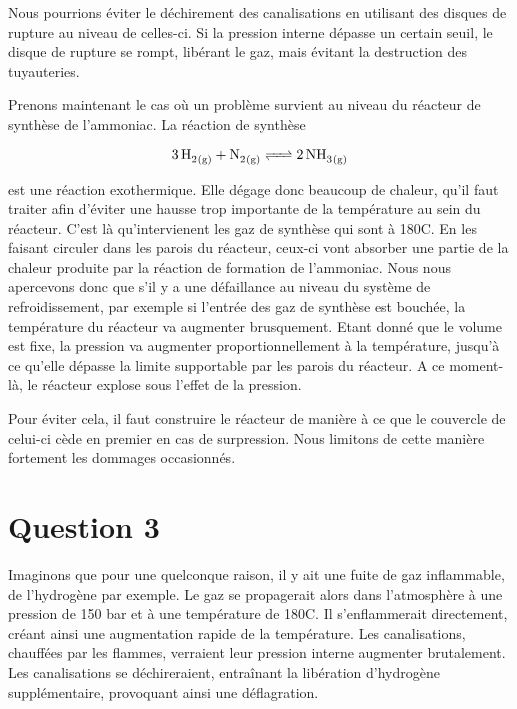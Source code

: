 \documentclass[a4paper,oneside,12pt]{article}
\begin{document}
Nous pourrions éviter le déchirement des canalisations en utilisant des disques de rupture au niveau de celles-ci. Si la pression interne dépasse un certain seuil, le disque de rupture se rompt, libérant le gaz, mais évitant la destruction des tuyauteries.
\newline

Prenons maintenant le cas où un problème survient au niveau du réacteur de synthèse de l'ammoniac. La réaction de synthèse

\begin{equation*}
	\ce{3 \, H2_{(g)} + N2_{(g)} <=> {2} \, NH3_{(g)}} 
\end{equation*}

est une réaction exothermique. Elle dégage donc beaucoup de chaleur, qu'il faut traiter afin d'éviter une hausse trop importante de la température au sein du réacteur. C'est là qu'intervienent les gaz de synthèse  qui sont à 180{\degre}C. En les faisant circuler dans les parois du réacteur, ceux-ci vont absorber une partie de la chaleur produite par la réaction de formation de l'ammoniac. Nous nous apercevons donc que s'il y a une défaillance au niveau du système de refroidissement, par exemple si l'entrée des gaz de synthèse est bouchée, la température du réacteur va augmenter brusquement. Etant donné que le volume est fixe, la pression va augmenter proportionnellement à la température, jusqu'à ce qu'elle dépasse la limite supportable par les parois du réacteur. A ce moment-là, le réacteur explose sous l'effet de la pression.
\newline

Pour éviter cela, il faut construire le réacteur de manière à ce que le couvercle de celui-ci cède en premier en cas de surpression. Nous limitons de cette manière fortement les dommages occasionnés.

\section*{Question 3}

Imaginons que pour une quelconque raison, il y ait une fuite de gaz inflammable, de l'hydrogène par exemple. Le gaz se propagerait alors dans l'atmosphère à une pression de 150 bar et à une température de 180{\degre}C. Il s'enflammerait directement, créant ainsi une augmentation rapide de la température. Les canalisations, chauffées par les flammes, verraient leur pression interne augmenter brutalement. Les canalisations se déchireraient, entraînant la libération d'hydrogène supplémentaire, provoquant ainsi une déflagration.
\end{document}
